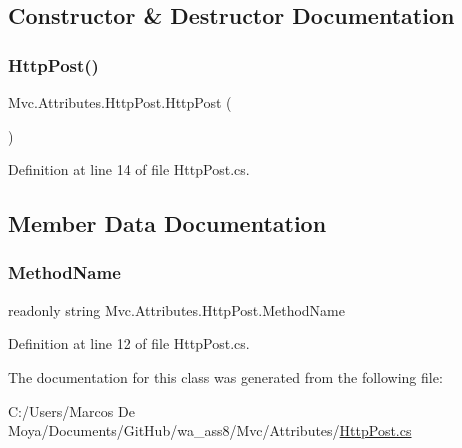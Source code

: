 \subsection{Constructor \& Destructor Documentation}
\mbox{\label{class_mvc_1_1_attributes_1_1_http_post_ab8f658703adddc573b72a6853d2697bb}} 
\subsubsection{\texorpdfstring{Http\+Post()}{HttpPost()}}
{\footnotesize\ttfamily Mvc.\+Attributes.\+Http\+Post.\+Http\+Post (\begin{DoxyParamCaption}{ }\end{DoxyParamCaption})}



Definition at line 14 of file Http\+Post.\+cs.



\subsection{Member Data Documentation}
\mbox{\label{class_mvc_1_1_attributes_1_1_http_post_aafe3fce3ed15c906b048a73978706926}} 
\subsubsection{\texorpdfstring{Method\+Name}{MethodName}}
{\footnotesize\ttfamily readonly string Mvc.\+Attributes.\+Http\+Post.\+Method\+Name}



Definition at line 12 of file Http\+Post.\+cs.



The documentation for this class was generated from the following file\+:\begin{DoxyCompactItemize}
\item 
C\+:/\+Users/\+Marcos De Moya/\+Documents/\+Git\+Hub/wa\+\_\+ass8/\+Mvc/\+Attributes/\hyperlink{_http_post_8cs}{Http\+Post.\+cs}\end{DoxyCompactItemize}
